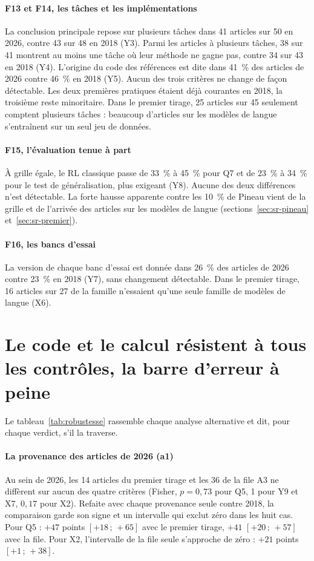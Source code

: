 \paragraph{F13 et F14, les tâches et les implémentations}
La conclusion principale repose sur plusieurs tâches dans 41 articles sur 50 en 2026, contre 43 sur 48
en 2018 (Y3). Parmi les articles à plusieurs tâches, 38 sur 41 montrent au moins une tâche où leur
méthode ne gagne pas, contre 34 sur 43 en 2018 (Y4). L'origine du code des références est dite dans
41~\% des articles de 2026 contre 46~\% en 2018 (Y5). Aucun des trois critères ne change de façon
détectable. Les deux premières pratiques étaient déjà courantes en 2018, la troisième reste
minoritaire. Dans le premier tirage, 25 articles sur 45 seulement comptent plusieurs tâches : beaucoup
d'articles sur les modèles de langue s'entraînent sur un seul jeu de données.

\paragraph{F15, l'évaluation tenue à part}
À grille égale, le RL classique passe de 33~\% à 45~\% pour Q7 et de 23~\% à 34~\% pour le test de
généralisation, plus exigeant (Y8). Aucune des deux différences n'est détectable. La forte hausse apparente
contre les 10~\% de Pineau vient de la grille et de l'arrivée des articles sur les modèles de langue (sections~\ref{sec:sr-pineau} et~\ref{sec:sr-premier}).

\paragraph{F16, les bancs d'essai}
La version de chaque banc d'essai est donnée dans 26~\% des articles de 2026 contre 23~\% en 2018 (Y7),
sans changement détectable. Dans le premier tirage, 16 articles sur 27 de la famille 
n'essaient qu'une seule famille de modèles de langue (X6).

\section{Le code et le calcul résistent à tous les contrôles, la barre d'erreur à peine}\label{sec:sr-robustesse}

Le tableau~\ref{tab:robustesse} rassemble chaque analyse alternative et dit, pour chaque verdict, s'il la
traverse.


\paragraph{La provenance des articles de 2026 (a1)}
Au sein de 2026, les 14 articles du premier tirage et les 36 de la file A3 ne diffèrent sur aucun des
quatre critères (Fisher, $p = 0{,}73$ pour Q5, 1 pour Y9 et X7, $0{,}17$ pour X2). Refaite avec chaque
provenance seule contre 2018, la comparaison garde son signe et un intervalle qui exclut zéro dans les
huit cas. Pour Q5 : $+47$ points $[+18\,;\,+65]$ avec le premier tirage, $+41$ $[+20\,;\,+57]$ avec la
file. Pour X2, l'intervalle de la file seule s'approche de zéro : $+21$ points $[+1\,;\,+38]$.

